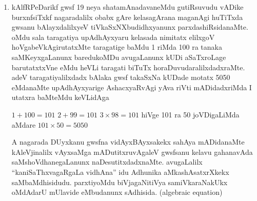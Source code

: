 \begin{enumerate}[\rm 1)]
\item kAlfRPeDarikf gwsf {\rm 19} neya shatamAnadavaneMdu gutiRsuvudu vADike burxnfsiTxkf nagaradalilx obabx gAre kelasagArana maganAgi huTiTxda gwsanu bAlayxdalilxyeV tiVkaSxNXbudidhxyanunx parxdashiRsidanaMte. oMdu sala taragatiya upAdhAyxyaru kelasada nimitatx elilxgoV hoVgabeVkAgirutatxMte taragatige baMdu {\rm 1} riMda {\rm 100} ra tanaka saMKeyxgaLanunx baredukoMDu avugaLanunx kUDi aSaTxroLage barutatxtxVne eMdu heVLi taragati biTuTx horaDuvudaralilxdadxraMte. adeV taragatiyalilxdadx bAlaka gwsf takaSxNa kUDade motatx {\rm 5050} eMdanaMte upAdhAyxyarige AshacxyaRvAgi yAva riVti mADidadxriMda I utatxra baMteMdu keVLidAga

$1+100=101$ \quad $2+99=101$ \quad $3\times 98=101$ \quad hiVge {\rm 101} ra {\rm 50} joVDigaLiMda aMdare \quad $101\times 50=5050$

A nagarada DUyxkanu gwsfna vidAyxBAyxsakekx sahAya mADidanaMte kAleVjinalilx vAyxsaMga mADutitxruvAgaleV gwsfsanu kelavu gahanavAda saMshoVdhanegaLanunx naDesutitxdadxnaMte. avugaLalilx ``kaniSaThxvagaRgaLa vidhAna'' idu Adhunika aMkashAsatxrXkekx saMbaMdhisidudu. parxtiyoMdu biVjagaNitiVya samiVkaraNakUkx oMdAdarU mUlavide eMbudanunx sAdhisida. {\rm (algebraic equation)}  


\end{enumerate}

